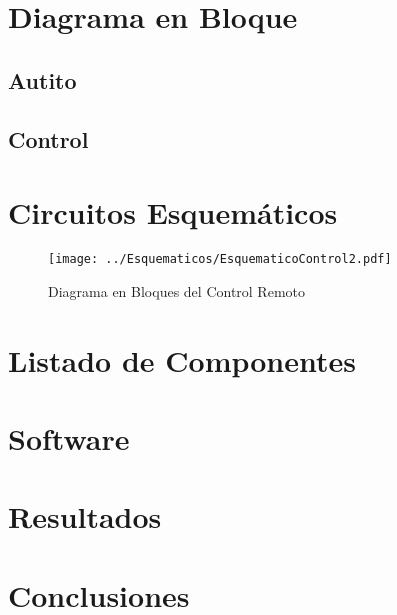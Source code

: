 \documentclass[a4paper,10pt]{article}
\begin{document}
		
	\section{Diagrama en Bloque}
		\subsection{Autito}
		\subsection{Control}

	\section{Circuitos Esquemáticos}
		\begin{figure}[!htb]
			\centering
			\texttt{[image: ../Esquematicos/EsquematicoControl2.pdf]}
			\caption{Diagrama en Bloques del Control Remoto} \label{img003}
		\end{figure}
	\section{Listado de Componentes}
	\section{Software}
	\section{Resultados}
	\section{Conclusiones}
\end{document}
